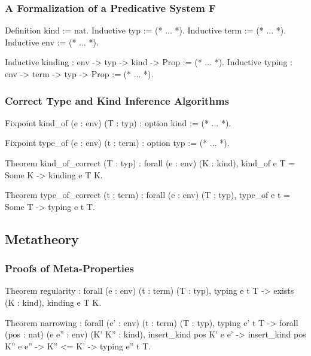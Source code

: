 \documentclass{beamer}
\begin{document}
\begin{frame}[fragile]

  \frametitle{A Formalization of a Predicative System F}

\begin{pyglist}
Definition kind := nat.
Inductive typ := (* ... *).
Inductive term := (* ... *).
Inductive env := (* ... *).
\end{pyglist}

\begin{pyglist}
Inductive kinding : env -> typ -> kind -> Prop := (* ... *).
Inductive typing : env -> term -> typ -> Prop := (* ... *).
\end{pyglist}

\end{frame}

\begin{frame}[fragile]

\frametitle{Correct Type and Kind Inference Algorithms}

\begin{pyglist}
Fixpoint kind_of (e : env) (T : typ) :
  option kind := (* ... *).
\end{pyglist}

\begin{pyglist}
Fixpoint type_of (e : env) (t : term) :
  option typ := (* ... *).
\end{pyglist}

\begin{pyglist}
Theorem kind_of_correct (T : typ) :
  forall (e : env) (K : kind), 
  kind_of e T = Some K -> kinding e T K.
\end{pyglist}

\begin{pyglist}
Theorem type_of_correct (t : term) : 
  forall (e : env) (T : typ), 
  type_of e t = Some T -> typing e t T.
\end{pyglist}

\end{frame}

\subsection{Metatheory}

\begin{frame}[fragile]

\frametitle{Proofs of Meta-Properties}

\begin{pyglist}
Theorem regularity :
  forall (e : env) (t : term) (T : typ),
    typing e t T ->
    exists (K : kind), kinding e T K.
\end{pyglist}

\begin{pyglist}
Theorem narrowing :
  forall (e' : env) (t : term) (T : typ),
    typing e' t T ->
    forall (pos : nat) (e e'' : env) (K' K'' : kind),
    insert_kind pos K' e e' ->
    insert_kind pos K'' e e'' ->
    K'' <= K' ->
    typing e'' t T.
\end{pyglist}

\end{frame}
\end{document}
